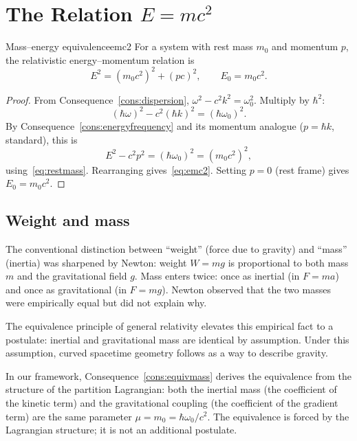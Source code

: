 \section{The Relation $E=mc^{2}$}
\label{sec:emc2}

\begin{consequence}{Mass--energy equivalence}{emc2}
For a system with rest mass $m_{0}$ and momentum $p$, the relativistic energy--momentum relation is
\begin{equation}
E^{2}=(m_{0}c^{2})^{2}+(pc)^{2},\qquad E_{0}=m_{0}c^{2}.
\label{eq:emc2}
\end{equation}
\end{consequence}

\begin{proof}
From Consequence~\ref{cons:dispersion}, $\omega^{2}-c^{2}k^{2}=\omega_{0}^{2}$. Multiply by $\hbar^{2}$:
\begin{equation*}
(\hbar\omega)^{2}-c^{2}(\hbar k)^{2}=(\hbar\omega_{0})^{2}.
\end{equation*}
By Consequence~\ref{cons:energyfrequency} and its momentum analogue ($p=\hbar k$, standard), this is
\begin{equation*}
E^{2}-c^{2}p^{2}=(\hbar\omega_{0})^{2}=(m_{0}c^{2})^{2},
\end{equation*}
using~\eqref{eq:restmass}. Rearranging gives~\eqref{eq:emc2}. Setting $p=0$ (rest frame) gives $E_{0}=m_{0}c^{2}$.
\end{proof}

\subsection{Weight and mass}

The conventional distinction between ``weight'' (force due to gravity) and ``mass'' (inertia) was sharpened by Newton: weight $W=mg$ is proportional to both mass $m$ and the gravitational field $g$. Mass enters twice: once as inertial (in $F=ma$) and once as gravitational (in $F=mg$). Newton observed that the two masses were empirically equal but did not explain why.

The equivalence principle of general relativity elevates this empirical fact to a postulate: inertial and gravitational mass are identical by assumption. Under this assumption, curved spacetime geometry follows as a way to describe gravity.

In our framework, Consequence~\ref{cons:equivmass} derives the equivalence from the structure of the partition Lagrangian: both the inertial mass (the coefficient of the kinetic term) and the gravitational coupling (the coefficient of the gradient term) are the same parameter $\mu=m_{0}=\hbar\omega_{0}/c^{2}$. The equivalence is forced by the Lagrangian structure; it is not an additional postulate.

